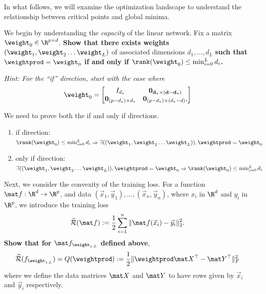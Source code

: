 \documentclass[11pt]{article}
\begin{document}
In what follows, we will examine the optimization landscape to understand the relationship between critical points and global minima.
\begin{Parts}
\Part
	We begin by understanding the \emph{capacity} of the linear network.
	Fix a matrix $\weight_0 \in \R^{p\times d}$. \textbf{Show that there exists weights} $(\weight_1, \weight_{2} \dots \weight_{L})$ of associated dimensions $d_1,\dots,d_L$ \textbf{such that $\weightprod  = \weight_0 $ if and only if $\rank(\weight_0) \le \min_{i=0}^L d_i$.} 

	\emph{Hint: For the ``if'' direction, start with the case where 
	\begin{align*}
	\weight_0 = \begin{bmatrix} I_{d_*} & \mathbf{0_{d_* \times (d - d_*)}} \\
\mathbf{0}_{(p - d_*) \times d_*} & \mathbf{0}_{(p - d_*) \times (d_*-d)},
\end{bmatrix}
	\end{align*} }

\begin{tcolorbox}[breakable]
	We need to prove both the if and only if directions. 
	\begin{enumerate}
		\item if direction: $\rank(\weight_0) \le \min_{i=0}^L d_i \Rightarrow \exists((\weight_1, \weight_{2} \dots \weight_{L})), \weightprod  = \weight_0$
		\item only if direction: $\exists((\weight_1, \weight_{2} \dots \weight_{L})), \weightprod  = \weight_0 \Rightarrow 	\rank(\weight_0) \le \min_{i=0}^L d_i$  
	\end{enumerate}
\end{tcolorbox}

\Part
Next, we consider the convexity of the training loss.
\newcommand{\riskhat}{\widehat{\mathcal{R}}}
For a function $\mat f: \R^{d} \to \R^p$, and data $(\vec x_1,\vec y_1),\dots,(\vec x_n,\vec y_n)$, where $x_i$ in $\R^{d}$ and $y_i$ in $\R^{p}$, we introduce the training loss
\begin{align*}
\riskhat(\mat f) := \frac{1}{2}\sum_{i=1}^n\|\mat f(\vec x_i) - \vec y_i\|_2^2. 
\end{align*}
\textbf{Show that for $\mat f_{\weight_{1:L}}$ defined above},
\begin{align*}
\riskhat(f_{\weight_{1:L}}) = Q(\weightprod) := \frac{1}{2}\|\weightprod\mat X^\top  - \mat Y^\top\|_F^2
\end{align*}
where we define the data matrices $\mat X$ and $\mat Y$ to have rows given by $\vec x_i$ and $\vec y_i$ respectively.


\end{Parts}
\end{document}
